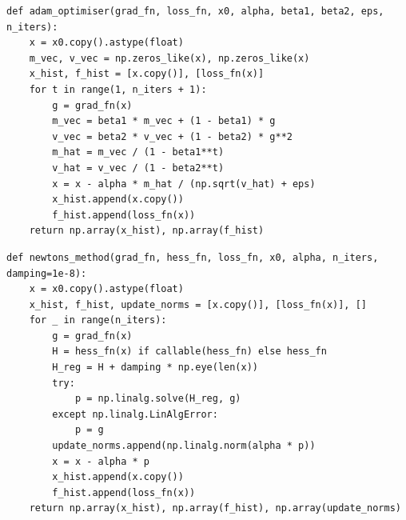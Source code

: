 \documentclass[11pt,a4paper]{article}
\begin{document}
\begin{lstlisting}[caption={Adam Optimiser}]
def adam_optimiser(grad_fn, loss_fn, x0, alpha, beta1, beta2, eps, n_iters):
    x = x0.copy().astype(float)
    m_vec, v_vec = np.zeros_like(x), np.zeros_like(x)
    x_hist, f_hist = [x.copy()], [loss_fn(x)]
    for t in range(1, n_iters + 1):
        g = grad_fn(x)
        m_vec = beta1 * m_vec + (1 - beta1) * g
        v_vec = beta2 * v_vec + (1 - beta2) * g**2
        m_hat = m_vec / (1 - beta1**t)
        v_hat = v_vec / (1 - beta2**t)
        x = x - alpha * m_hat / (np.sqrt(v_hat) + eps)
        x_hist.append(x.copy())
        f_hist.append(loss_fn(x))
    return np.array(x_hist), np.array(f_hist)
\end{lstlisting}

\begin{lstlisting}[caption={Newton's Method}]
def newtons_method(grad_fn, hess_fn, loss_fn, x0, alpha, n_iters, damping=1e-8):
    x = x0.copy().astype(float)
    x_hist, f_hist, update_norms = [x.copy()], [loss_fn(x)], []
    for _ in range(n_iters):
        g = grad_fn(x)
        H = hess_fn(x) if callable(hess_fn) else hess_fn
        H_reg = H + damping * np.eye(len(x))
        try:
            p = np.linalg.solve(H_reg, g)
        except np.linalg.LinAlgError:
            p = g
        update_norms.append(np.linalg.norm(alpha * p))
        x = x - alpha * p
        x_hist.append(x.copy())
        f_hist.append(loss_fn(x))
    return np.array(x_hist), np.array(f_hist), np.array(update_norms)
\end{lstlisting}
\end{document}
